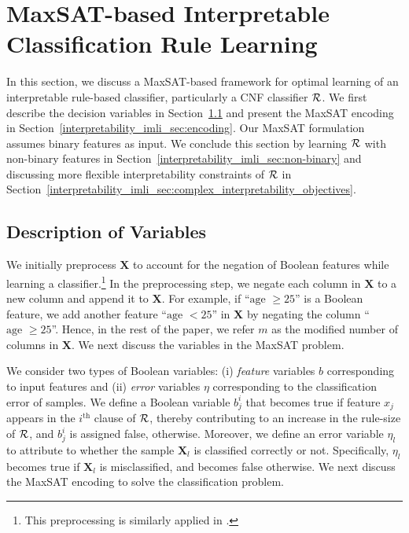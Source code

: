 \section{MaxSAT-based Interpretable Classification Rule Learning}
\label{interpretability_imli_sec:baseline}
In this section, we discuss a MaxSAT-based framework for optimal learning of an interpretable rule-based classifier, particularly a CNF classifier $ {\mathcal{R}} $. 
We first describe the decision variables in Section~\ref{interpretability_imli_sec:variables} and present the MaxSAT encoding  in Section~\ref{interpretability_imli_sec:encoding}. Our MaxSAT formulation assumes binary features as input. We
conclude this section by learning $ {\mathcal{R}} $ with non-binary features in Section~\ref{interpretability_imli_sec:non-binary} and discussing more flexible interpretability constraints of $ {\mathcal{R}} $ in Section~\ref{interpretability_imli_sec:complex_interpretability_objectives}.  



\subsection{Description of Variables}
\label{interpretability_imli_sec:variables} 
We initially preprocess $ \mathbf{X} $  to account for the negation of  Boolean features while learning a classifier.\footnote{This preprocessing is similarly applied in  \cite{malioutov2013exact}.} In the preprocessing step, we negate each column in $ \mathbf{X} $ to a new column and append it to $ \mathbf{X} $. For example, if ``$ \text{age }\ge 25 $'' is a Boolean feature, we add another feature ``$ \text{age }< 25 $'' in  $ \mathbf{X} $ by negating the column ``$ \text{age }\ge 25 $''. Hence, in the rest of the paper, we refer $ m $ as the modified number of columns in $ \mathbf{X} $. We next discuss the variables in the MaxSAT problem. 

We consider two types of Boolean variables: (i) \emph{feature} variables $ b $ corresponding to input features and (ii) \emph{error} variables $ \eta $ corresponding to the classification error of samples. We define a Boolean variable $ b^i_j $ that becomes true if feature $ x_j $ appears in the $ i^\text{th} $ clause of $ {\mathcal{R}} $, thereby contributing to an increase in the rule-size of $ {\mathcal{R}} $, and $ b^i_j $ is assigned false, otherwise. Moreover, we define an error variable $ \eta_l $ to attribute to whether the sample $ \mathbf{X}_l $ is classified correctly or not. Specifically, $ \eta_l $ becomes true if $ \mathbf{X}_l $ is misclassified, and becomes false otherwise.  We next discuss the MaxSAT encoding to solve the classification problem.   




